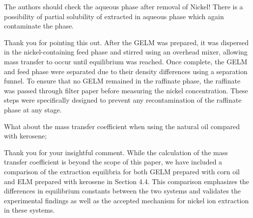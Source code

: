 \documentclass[11pt,answers]{exam}
\begin{document}
\begin{questions}
\begin{solutionorbox}[5.5cm]
 
 \end{solutionorbox}
\question The authors should check the aqueous phase after removal of Nickel! There is a possibility of partial solubility of extracted in aqueous phase which again contaminate the phase.
 \begin{solutionorbox}[5.5cm]

 Thank you for pointing this out. After the GELM was prepared, it was dispersed in the nickel-containing feed phase and stirred using an overhead mixer, allowing mass transfer to occur until equilibrium was reached. Once complete, the GELM and feed phase were separated due to their density differences using a separation funnel. To ensure that no GELM remained in the raffinate phase, the raffinate was passed through filter paper before measuring the nickel concentration. These steps were specifically designed to prevent any recontamination of the raffinate phase at any stage. 
 
 \end{solutionorbox}
\question What about the mass transfer coefficient when using the natural oil compared with kerosene;
 \begin{solutionorbox}[5.5cm]

Thank you for your insightful comment. While the calculation of the mass transfer coefficient is beyond the scope of this paper, we have included a comparison of the extraction equilibria for both GELM prepared with corn oil and ELM prepared with kerosene in Section 4.4. This comparison emphasizes the differences in equilibrium constants between the two systems and validates the experimental findings as well as the accepted mechanism for nickel ion extraction in these systems.
 
 \end{solutionorbox}
\end{questions}
\newpage
\end{document}
